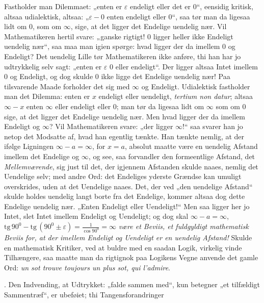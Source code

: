 \documentclass[12pt,a4paper]{book}
\begin{document}
{%
\par Fastholder man Dilemmaet: „enten er $\varepsilon$ endeligt eller
det er $0$“, eensidig kritisk, altsaa udialektisk, altsaa:
„$\varepsilon - 0$ enten endeligt eller $0$“, saa tør man da ligesaa
lidt om $0$, som om $\infty$, sige, at det ligger det Endelige uendelig
nær. Vil Mathematikeren hertil svare: „ganske rigtigt! $0$ ligger
heller ikke Endeligt uendelig nær“, saa maa man igien spørge: hvad
ligger der da imellem $0$ og Endeligt? Det uendelig Lille tør
Mathematikeren ikke anføre, thi han har jo udtrykkelig selv sagt:
„enten er $\varepsilon$ $0$ eller endeligt“. Der ligger altsaa Intet
imellem $0$ og Endeligt, og dog skulde $0$ ikke ligge det Endelige
uendelig nær! Paa tilsvarende Maade forholder det sig med $\infty$ og
Endeligt. Udialektisk fastholder man det Dilemma: enten er $x$ endeligt
eller uendeligt, \textit{tertium non datur}; altsaa $\infty - x$ enten
$\infty$ eller endeligt eller $0$; man tør da ligesaa lidt om $\infty$
som om $0$ sige, at det ligger det Endelige uendelig nær. Men hvad
ligger der da imellem Endeligt og $\infty$? Vil Mathematikeren svare:
„der ligger $\infty$!“ saa svarer han jo netop det Modsatte af, hvad
han egentlig tænkte. Han tænkte nemlig, at der ifølge Ligningen
$\infty - a = \infty$, for $x = a$, absolut maatte være en uendelig
Afstand imellem det Endelige og $\infty$, og see, saa forvandler den
formeentlige Afstand, det \emph{Mellemværende}, sig just til det, der
igjennem Afstanden skulde naaes, nemlig det Uendelige selv; med andre
Ord: det Endeliges yderste Grændse kan umuligt overskrides, uden at det
Uendelige naaes. Det, der ved „den uendelige Afstand“ skulde holdes
uendelig langt borte fra det Endelige, kommer altsaa dog dette Endelige
uendelig nær. „Enten Endeligt eller Uendeligt!“ Men saa ligger her jo
Intet, slet Intet imellem Endeligt og Uendeligt; og dog skal
$\infty - a = \infty$, $\mathrm{tg}\,90^{0} - \mathrm{tg}\,(90^{0} \pm
\varepsilon) = \frac{1}{\cos 90^{0}} = \infty$ \emph{være et Beviis, et
fuldgyldigt mathematisk Beviis for, at der imellem Endeligt og
Uendeligt er en uendelig Afstand!} Skulde en mathematisk Kritiker, ved
at buldre med en saadan Logik, virkelig vinde Tilhængere, saa maatte
man da rigtignok paa Logikens Vegne anvende det gamle Ord: \textit{un
sot trouve toujours un plus sot, qui l'admire}.}. Den Indvending, at
Udtrykket: „falde sammen med“, kun betegner „et tilfældigt
Sammentræf“, er ubeføiet; thi Tangensforandringer
\end{document}
